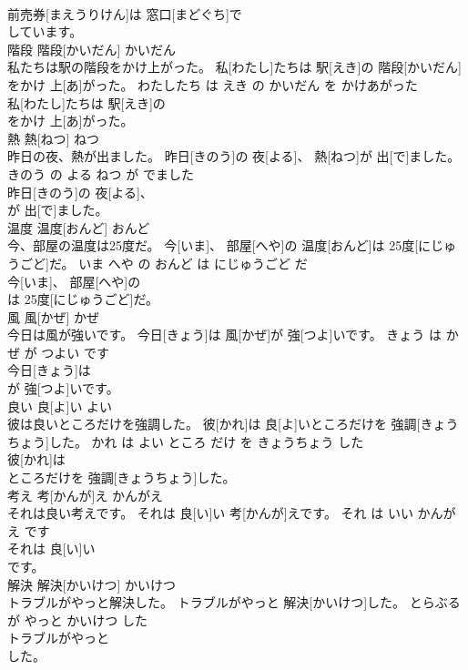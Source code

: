 \documentclass[8pt]{extreport}
\begin{document}
\begin{CJK}{UTF8}{min}
\\	前売券[まえうりけん]は 窓口[まどぐち]で
\\	しています。			
\\	階段	階段[かいだん]	かいだん	
\\	私たちは駅の階段をかけ上がった。	私[わたし]たちは 駅[えき]の 階段[かいだん]をかけ 上[あ]がった。	わたしたち は えき の かいだん を かけあがった	
\\	私[わたし]たちは 駅[えき]の
\\	をかけ 上[あ]がった。			
\\	熱	熱[ねつ]	ねつ	
\\	昨日の夜、熱が出ました。	昨日[きのう]の 夜[よる]、 熱[ねつ]が 出[で]ました。	きのう の よる ねつ が でました	
\\	昨日[きのう]の 夜[よる]、
\\	が 出[で]ました。			
\\	温度	温度[おんど]	おんど	
\\	今、部屋の温度は25度だ。	今[いま]、 部屋[へや]の 温度[おんど]は 25度[にじゅうごど]だ。	いま へや の おんど は にじゅうごど だ	
\\	今[いま]、 部屋[へや]の
\\	は 25度[にじゅうごど]だ。			
\\	風	風[かぜ]	かぜ	
\\	今日は風が強いです。	今日[きょう]は 風[かぜ]が 強[つよ]いです。	きょう は かぜ が つよい です	
\\	今日[きょう]は
\\	が 強[つよ]いです。			
\\	良い	良[よ]い	よい	
\\	彼は良いところだけを強調した。	彼[かれ]は 良[よ]いところだけを 強調[きょうちょう]した。	かれ は よい ところ だけ を きょうちょう した	
\\	彼[かれ]は
\\	ところだけを 強調[きょうちょう]した。			
\\	考え	考[かんが]え	かんがえ	
\\	それは良い考えです。	それは 良[い]い 考[かんが]えです。	それ は いい かんがえ です	
\\	それは 良[い]い
\\	です。			
\\	解決	解決[かいけつ]	かいけつ	
\\	トラブルがやっと解決した。	トラブルがやっと 解決[かいけつ]した。	とらぶる が やっと かいけつ した	
\\	トラブルがやっと
\\	した。			

\end{CJK}
\end{document}
